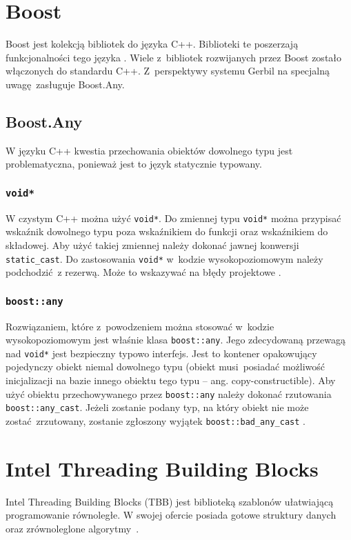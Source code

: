  \section{Boost}
Boost jest kolekcją bibliotek do języka C++. Biblioteki te poszerzają funkcjonalności tego języka \cite{boost}. Wiele z~bibliotek rozwijanych przez Boost zostało włączonych do standardu C++. Z~perspektywy systemu Gerbil na specjalną uwagę zasługuje Boost.Any.



\subsection{Boost.Any}
W języku C++ kwestia przechowania obiektów dowolnego typu jest problematyczna, ponieważ jest to język statycznie typowany. 

\subsubsection{\lstinline$void*$}
W czystym C++ można użyć \lstinline$void*$. Do zmiennej typu \lstinline$void*$ można przypisać wskaźnik dowolnego typu poza wskaźnikiem do funkcji oraz wskaźnikiem do składowej. Aby użyć takiej zmiennej należy dokonać jawnej konwersji \lstinline$static_cast$. Do zastosowania \lstinline$void*$ w~kodzie wysokopoziomowym należy podchodzić z rezerwą. Może to wskazywać na błędy projektowe \cite{Stroustrup}.

\subsubsection{\lstinline$boost::any$}
Rozwiązaniem, które z~powodzeniem można stosować w~kodzie wysokopoziomowym jest właśnie klasa \lstinline$boost::any$. Jego zdecydowaną przewagą nad \lstinline$void*$ jest bezpieczny typowo interfejs. Jest to kontener opakowujący pojedynczy obiekt niemal dowolnego typu (obiekt musi posiadać możliwość inicjalizacji na bazie innego obiektu tego typu -- ang. copy-constructible).
Aby użyć obiektu przechowywanego przez \lstinline$boost::any$ należy dokonać rzutowania \lstinline$boost::any_cast$. Jeżeli zostanie podany typ, na który obiekt nie może zostać zrzutowany, zostanie zgłoszony wyjątek \lstinline$boost::bad_any_cast$ \cite{boost}.

 \section{Intel Threading Building Blocks}
Intel Threading Building Blocks (TBB) jest biblioteką szablonów ułatwiającą programowanie równoległe. W swojej ofercie posiada gotowe struktury danych oraz zrównoleglone algorytmy~\cite{tbb}.

